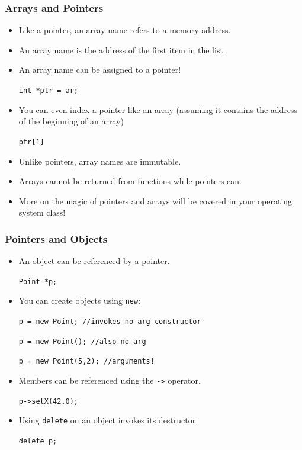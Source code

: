 \documentclass[handout]{beamer}
\begin{document}
\begin{frame}
    \frametitle{Arrays and Pointers}
    \begin{itemize}
        \item Like a pointer, an array name refers to a memory address.
        \item An array name is the address of the first item in the list.
        \item An array name can be assigned to a pointer!
            \par{\tt int *ptr = ar;}
        \item You can even index a pointer like an array (assuming it 
            contains the address of the beginning of an array)
            \par{\tt ptr[1]}
        \item Unlike pointers, array names are immutable.
        \item Arrays cannot be returned from functions while pointers can.
        \item More on the magic of pointers and arrays will be covered in
            your operating system class!
    \end{itemize}
\end{frame}


\begin{frame}
    \frametitle{Pointers and Objects}
    \begin{itemize}
        \item An object can be referenced by a pointer.
            \par{\tt Point *p;}
        \item You can create objects using {\tt new}:
            \par{\tt p = new Point; //invokes no-arg constructor}
            \par{\tt p = new Point(); //also no-arg}
            \par{\tt p = new Point(5,2); //arguments!}
        \item Members can be referenced using the {\tt ->} operator.
            \par{\tt p->setX(42.0);}
        \item Using {\tt delete} on an object invokes its destructor.
            \par{\tt delete p;}
    \end{itemize}
\end{frame}
\end{document}
